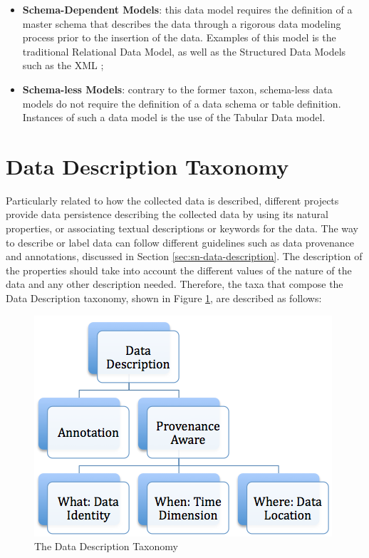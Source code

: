 \begin{itemize}
  \item \textbf{Schema-Dependent Models}: this data model requires the
  definition of a master schema that describes the data through a rigorous
  data modeling process prior to the insertion of the data. Examples of this
  model is the traditional Relational Data Model\cite{relational-model}, as
 well as the Structured Data Models such as the XML \cite{xml};
  \item \textbf{Schema-less Models}: contrary to the former taxon, schema-less
  data models do not require the definition of a data schema or table
  definition. Instances of such a data model is the use of the 
  Tabular Data model.
\end{itemize}

\section{Data Description Taxonomy}
\label{sec:data-description-taxonomy}

Particularly related to how the collected data is described, different projects
provide data persistence describing the collected data by using its natural
properties, or associating textual descriptions or keywords for the data. The
way to describe or label data can follow different guidelines such as data provenance
and annotations, discussed in Section \ref{sec:sn-data-description}. The description of the
properties should take into account the different values of the nature of the
data and any other description needed. Therefore, the taxa that compose the
Data Description taxonomy, shown in Figure
\ref{fig:taxonomy-data-description}, are described as follows:

\begin{figure}[h]
  \centering
  \includegraphics[scale=0.5]{../diagrams/taxonomy-data-description}
  \caption{The Data Description Taxonomy}
  \label{fig:taxonomy-data-description}
\end{figure}

